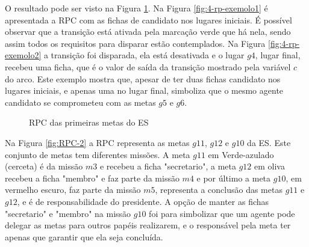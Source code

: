 O resultado pode ser visto na Figura \ref{fig:RPC-1}. Na Figura \ref{fig:4-rp-exemolo1} é apresentada a RPC com as fichas de candidato nos lugares iniciais. É possível observar que a transição está ativada pela marcação verde que há nela, sendo assim todos os requisitos para disparar estão contemplados. Na Figura \ref{fig:4-rp-exemolo2} a transição foi disparada, ela está desativada e o lugar $g4$, lugar final, recebeu uma ficha, que é o valor de saída da transição mostrado pela variável $c$ do arco. Este exemplo mostra que, apesar de ter duas fichas candidato nos lugares iniciais, e apenas uma no lugar final, simboliza que o mesmo agente candidato se comprometeu com as metas $g5$ e $g6$.

\begin{figure}[ht]
  \centering
  \caption{RPC das primeiras metas do ES}
  \label{fig:RPC-1}
\end{figure}

Na Figura \ref{fig:RPC-2} a RPC representa as metas $g11$, $g12$ e $g10$ da ES. Este conjunto de metas tem diferentes missões. A meta $g11$ em Verde-azulado (cerceta) é da missão $m3$ e recebeu a ficha "secretario", a meta $g12$ em oliva recebeu a ficha "membro" e faz parte da missão $m4$ e por último a meta $g10$, em vermelho escuro, faz parte da missão $m5$, representa a conclusão das metas $g11$ e $g12$, e é de responsabilidade do presidente. A opção de manter as fichas "secretario" e "membro" na missão $g10$ foi para simbolizar que um agente pode delegar as metas para outros papéis realizarem, e o responsável pela meta ter apenas que garantir que ela seja concluída.

